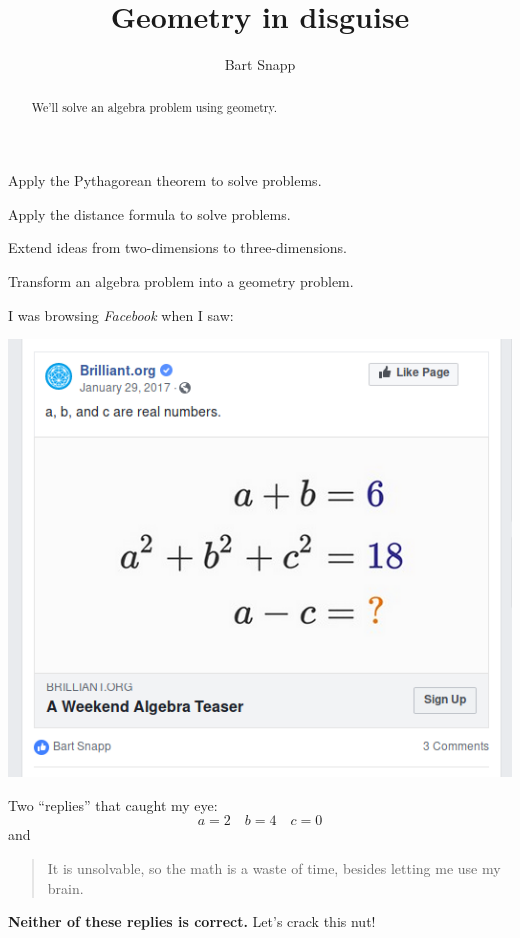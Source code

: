 \documentclass[noauthor,nooutcomes,handout]{ximera}
\title{Geometry in disguise}
\author{Bart Snapp}
\begin{document}
\begin{abstract}
  We'll solve an algebra problem using geometry.
\end{abstract}
\maketitle

\begin{listOutcomes}
\item Apply the Pythagorean theorem to solve problems.
\item Apply the distance formula to solve problems.
\item Extend ideas from two-dimensions to three-dimensions.
\item Transform an algebra problem into a geometry problem.
\end{listOutcomes}

I was browsing \textsl{Facebook} when I saw:
\begin{center}
  \includegraphics[width=.6\textwidth]{fbQuestion.png}
\end{center}


Two ``replies'' that caught my eye:
\[
a = 2\quad b=4\quad c=0
\]
and
\begin{quote}
  It is unsolvable, so the math is a waste of time, besides letting
  me use my brain.
\end{quote}
\textbf{Neither of these replies is correct.} Let's crack this nut!


\mynewpage
  
\end{document}
